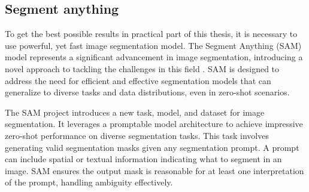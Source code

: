 


  \subsection{Segment anything}
To get the best possible results in practical part of this thesis, it is necessary to use powerful, yet fast image
segmentation model. The Segment Anything (SAM) model represents a significant advancement in image segmentation,
introducing a novel approach to tackling the challenges in this field \cite{SAM2023}. SAM is designed to address the need for
efficient and effective segmentation models that can generalize to diverse tasks and data distributions, even in zero-shot scenarios.

The SAM project introduces a new task, model, and dataset for image segmentation. It leverages a promptable model
architecture to achieve impressive zero-shot performance on diverse segmentation tasks. This task involves generating valid segmentation masks given any segmentation prompt. A prompt can include spatial or textual information indicating what to segment in an image. SAM ensures the output mask is reasonable for at least one interpretation of the prompt, handling ambiguity effectively.

